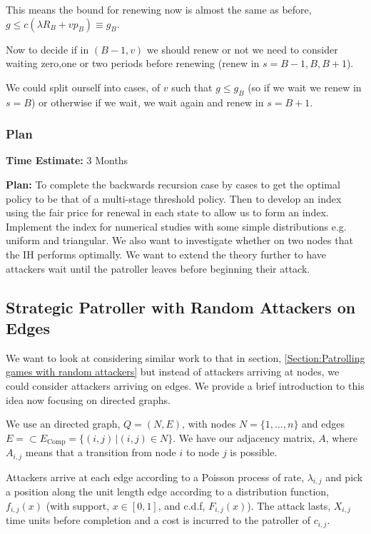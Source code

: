 \documentclass[a4paper,10pt]{article}
\theoremstyle{definition}
\theoremstyle{definition}
\theoremstyle{remark}
\theoremstyle{definition}
\begin{document}
This means the bound for renewing now is almost the same as before, $g \leq c (\lambda R_{B} + v p_{B}) \equiv g_{B}$.

Now to decide if in $(B-1,v)$ we should renew or not we need to consider waiting zero,one or two periods before renewing (renew in $s=B-1,B,B+1$).

We could split ourself into cases, of $v$ such that $g \leq g_{B}$ (so if we wait we renew in $s=B$) or otherwise if we wait, we wait again and renew in $s=B+1$.

\subsubsection{Plan}
\textbf{Time Estimate:} 3 Months

\textbf{Plan:} To complete the backwards recursion case by cases to get the optimal policy to be that of a multi-stage threshold policy. Then to develop an index using the fair price for renewal in each state to allow us to form an index. Implement the index for numerical studies with some simple distributions e.g. uniform and triangular. We also want to investigate whether on two nodes that the IH performs optimally. We want to extend the theory further to have attackers wait until the patroller leaves before beginning their attack. 

\subsection{Strategic Patroller with Random Attackers on Edges}
We want to look at considering similar work to that in section, \ref{Section:Patrolling games with random attackers} but instead of attackers arriving at nodes, we could consider attackers arriving on edges. We provide a brief introduction to this idea now focusing on directed graphs.

We use an directed graph, $Q=(N,E)$, with nodes $N=\{1,...,n \}$ and edges $E= \subset E_{\text{Comp}}= \{(i,j) \, | (i,j) \in N  \}$. We have our adjacency matrix, $A$, where $A_{i,j}$ means that a transition from node $i$ to node $j$ is possible.

Attackers arrive at each edge according to a Poisson process of rate, $\lambda_{i,j}$ and pick a position along the unit length edge according to a distribution function, $f_{i,j}(x)$ (with support, $x \in [0,1]$, and c.d.f, $F_{i,j}(x)$). The attack lasts, $X_{i,j}$ time units before completion and a cost is incurred to the patroller of $c_{i,j}$.
\end{document}
